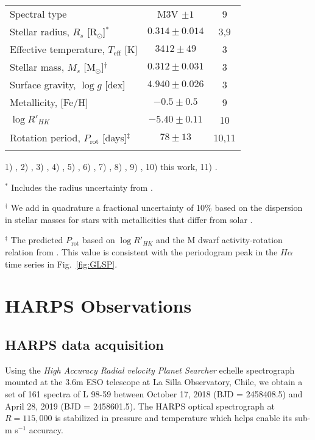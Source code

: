 \documentclass[longauth]{aa}
\newcommand{\prot}{$P_{\text{rot}}$}
\newcommand{\mps}{m s$^{-1}$}
\newcommand{\teff}{$T_{\text{eff}}$}
\begin{document}
\begin{table}[t]
\begin{tabular}{lcc}
    Spectral type & M3V $\pm 1$ & 9 \\
    Stellar radius, $R_s$ [R$_{\odot}$]$^*$ & $0.314\pm 0.014$ & 3,9 \\
    Effective temperature, \teff{} [K] & $3412\pm 49$ & 3 \\
    Stellar mass, $M_s$ [M$_{\odot}$]$^{\dagger}$ & $0.312\pm 0.031$ & 3 \\
    Surface gravity, $\log{g}$ [dex] & $4.940\pm 0.026$ & 3 \\
    Metallicity, [Fe/H] & $-0.5\pm 0.5$ & 9 \\
    $\log{R'_{HK}}$ & $-5.40\pm 0.11$ & 10 \\
    Rotation period, \prot{} [days]$^{\ddagger}$ & $78\pm 13$ & 10,11 \\
    \hline\noalign{\smallskip}
  \end{tabular}
  
  \begin{list}{}{}
    \item 1) \cite{gaia18}, 2) \cite{lindegren18}, 3) \citealt{cloutier19b,benedict16}, 4) \cite{henden16}, 5) \cite{evans18}, 6) \cite{stassun17}, 7) \cite{cutri03}, 8) \cite{cutri13}, 9) \cite{kostov19}, 10) this work, 11) \cite{astudillodefru17b}.
    \item $^*$ Includes the radius uncertainty from \citep{kostov19}. 
    \item $^{\dagger}$ We add in quadrature a fractional uncertainty of 10\% based on the dispersion in stellar masses for stars with metallicities that differ from solar \citep{mann19}.
    \item $^{\ddagger}$ The predicted \prot{} based on $\log{R'_{HK}}$ and the M dwarf activity-rotation relation from \cite{astudillodefru17b}. This value is consistent with the periodogram peak in the $H\alpha$ time series in Fig.~\ref{fig:GLSP}.
  \end{list}
\end{table}

\section{HARPS Observations}
\label{sec:rv}
\subsection{HARPS data acquisition}
Using the \textit{High Accuracy Radial velocity Planet Searcher} \citep[HARPS;][]{mayor03} echelle spectrograph mounted at the 3.6m ESO telescope at La Silla Observatory, Chile, we obtain a set of 161 spectra of L 98-59 between October 17, 2018 (BJD = 2458408.5) and April 28, 2019 (BJD = 2458601.5). The HARPS optical spectrograph at $R=115,000$ is stabilized in pressure and temperature which helps enable its sub-\mps{} accuracy. 
\end{document}
